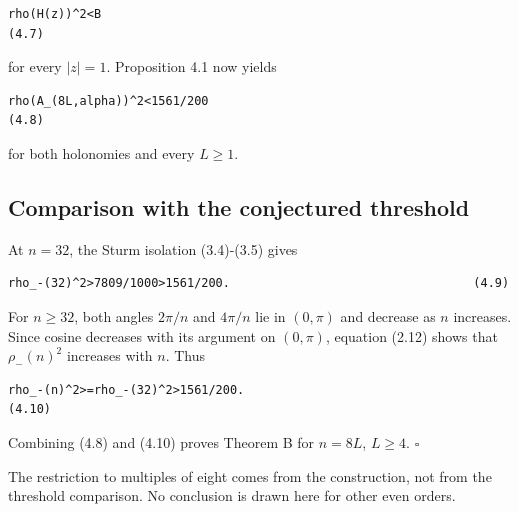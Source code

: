 \begin{lstlisting}[language={}]
rho(H(z))^2<B                                                        (4.7)
\end{lstlisting}

for every \(|z|=1\). Proposition 4.1 now yields

\begin{lstlisting}[language={}]
rho(A_(8L,alpha))^2<1561/200                                      (4.8)
\end{lstlisting}

for both holonomies and every \(L\ge 1\).

\subsection{Comparison with the conjectured threshold}

At \(n=32\), the Sturm isolation (3.4)-(3.5) gives

\begin{lstlisting}[language={}]
rho_-(32)^2>7809/1000>1561/200.                                  (4.9)
\end{lstlisting}

For \(n\ge 32\), both angles \(2\pi/n\) and \(4\pi/n\) lie in \((0,\pi)\) and decrease as
\(n\) increases. Since cosine decreases with its argument on \((0,\pi)\), equation
(2.12) shows that \(\rho_-(n)^2\) increases with \(n\). Thus

\begin{lstlisting}[language={}]
rho_-(n)^2>=rho_-(32)^2>1561/200.                                (4.10)
\end{lstlisting}

Combining (4.8) and (4.10) proves Theorem B for \(n=8L\), \(L\ge 4\). \(\square\)

The restriction to multiples of eight comes from the construction, not from
the threshold comparison. No conclusion is drawn here for other even orders.

